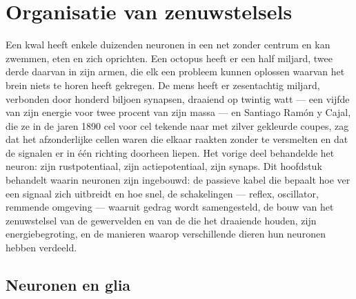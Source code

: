 \chapter{Organisatie van zenuwstelsels}\label{ch:b3:nervous-systems}

Een kwal heeft enkele duizenden neuronen in een net zonder centrum en
kan zwemmen, eten en zich oprichten. Een octopus heeft er een half
miljard, twee derde daarvan in zijn armen, die elk een probleem kunnen
oplossen waarvan het brein niets te horen heeft gekregen. De mens heeft
er zesentachtig miljard, verbonden door honderd biljoen synapsen,
draaiend op twintig watt --- een vijfde van zijn energie voor twee
procent van zijn massa --- en Santiago Ramón y Cajal, die ze in de
jaren 1890 cel voor cel tekende naar met zilver gekleurde coupes, zag
dat het afzonderlijke cellen waren die elkaar raakten zonder te
versmelten en dat de signalen er in één richting doorheen liepen. Het
vorige deel behandelde het neuron: zijn rustpotentiaal, zijn
actiepotentiaal, zijn synaps. Dit hoofdstuk behandelt waarin neuronen
zijn ingebouwd: de passieve kabel die bepaalt hoe ver een signaal zich
uitbreidt en hoe snel, de schakelingen --- reflex, oscillator, remmende
omgeving --- waaruit gedrag wordt samengesteld, de bouw van het
zenuwstelsel van de gewervelden en van de  die het draaiende
houden, zijn energiebegroting, en de manieren waarop verschillende
dieren hun neuronen hebben verdeeld.

\section{Neuronen en glia}

